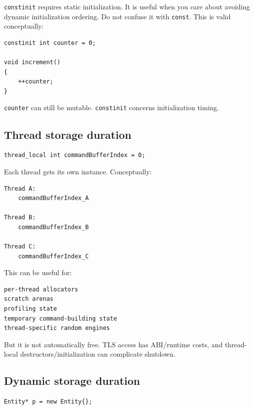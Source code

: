\texttt{constinit} requires static initialization. It is useful when you care about avoiding dynamic initialization ordering. Do not confuse it with \texttt{const}. This is valid conceptually:

\begin{verbatim}
constinit int counter = 0;

void increment()
{
    ++counter;
}
\end{verbatim}

\texttt{counter} can still be mutable. \texttt{constinit} concerns initialization timing.

\subsection{Thread storage duration}\label{05-engine-i-ch002-thread-storage-duration}

\hypertarget{05-engine-i-ch002-thread-storage-duration}{}

\begin{verbatim}
thread_local int commandBufferIndex = 0;
\end{verbatim}

Each thread gets its own instance. Conceptually:

\begin{verbatim}
Thread A:
    commandBufferIndex_A

Thread B:
    commandBufferIndex_B

Thread C:
    commandBufferIndex_C
\end{verbatim}

This can be useful for:

\begin{verbatim}
per-thread allocators
scratch arenas
profiling state
temporary command-building state
thread-specific random engines
\end{verbatim}

But it is not automatically free. TLS access has ABI/runtime costs, and thread-local destructors/initialization can complicate shutdown.

\subsection{Dynamic storage duration}\label{05-engine-i-ch002-dynamic-storage-duration}

\hypertarget{05-engine-i-ch002-dynamic-storage-duration}{}

\begin{verbatim}
Entity* p = new Entity{};
\end{verbatim}


